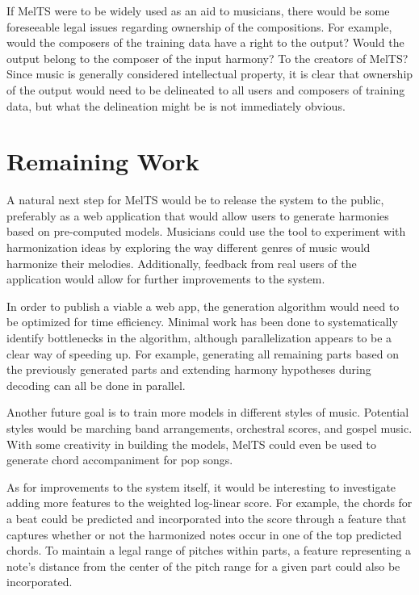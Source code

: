 \documentclass{sig-alternate}
\begin{document}
If MelTS were to be widely used as an aid to musicians, there would be some foreseeable legal issues regarding ownership of the compositions. For example, would the composers of the training data have a right to the output? Would the output belong to the composer of the input harmony? To the creators of MelTS? Since music is generally considered intellectual property, it is clear that ownership of the output would need to be delineated to all users and composers of training data, but what the delineation might be is not immediately obvious.
\label{sec:ethics}

\section{Remaining Work}
A natural next step for MelTS would be to release the system to the public, preferably as a web application that would allow users to generate harmonies based on pre-computed models. Musicians could use the tool to experiment with harmonization ideas by exploring the way different genres of music would harmonize their melodies. Additionally, feedback from real users of the application would allow for further improvements to the system. 

In order to publish a viable a web app, the generation algorithm would need to be optimized for time efficiency. Minimal work has been done to systematically identify bottlenecks in the algorithm, although parallelization appears to be a clear way of speeding up. For example, generating all remaining parts based on the previously generated parts and extending harmony hypotheses during decoding can all be done in parallel.

Another future goal is to train more models in different styles of music. Potential styles would be marching band arrangements, orchestral scores, and gospel music. With some creativity in building the models, MelTS could even be used to generate chord accompaniment for pop songs.

As for improvements to the system itself, it would be interesting to investigate adding more features to the weighted log-linear score. For example, the chords for a beat could be predicted and incorporated into the score through a feature that captures whether or not the harmonized notes occur in one of the top predicted chords. To maintain a legal range of pitches within parts, a feature representing a note's distance from the center of the pitch range for a given part could also be incorporated.
\label{sec:remaining_work}



\label{app}
\end{document}
